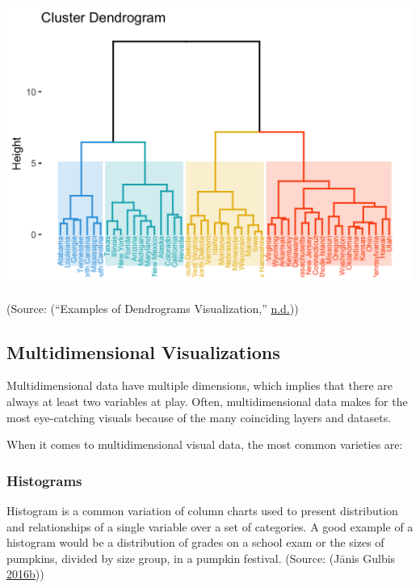 \documentclass[]{book}
\begin{document}
\includegraphics{images/dendrogram-diag.png}

(Source: (``Examples of Dendrograms Visualization,'' \protect\hyperlink{ref-dendrogram-diag}{n.d.}))

\hypertarget{multidimensional-visualizations}{%
\subsection{Multidimensional Visualizations}\label{multidimensional-visualizations}}

Multidimensional data have multiple dimensions, which implies that there are always at least two variables at play. Often, multidimensional data makes for the most eye-catching visuals because of the many coinciding layers and datasets.

When it comes to multidimensional visual data, the most common varieties are:

\hypertarget{histograms}{%
\subsubsection{Histograms}\label{histograms}}

Histogram is a common variation of column charts used to present distribution and relationships of a single variable over a set of categories. A good example of a histogram would be a distribution of grades on a school exam or the sizes of pumpkins, divided by size group, in a pumpkin festival.
(Source: (Jānis Gulbis \protect\hyperlink{ref-pick_chart}{2016}\protect\hyperlink{ref-pick_chart}{b}))
\end{document}
